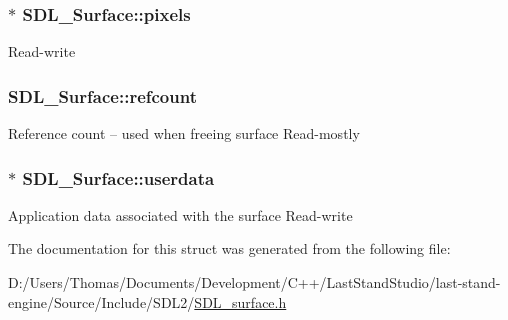 \subsubsection[{pixels}]{$\ast$ S\+D\+L\+\_\+\+Surface\+::pixels}\label{structSDL__Surface_abd9597e0e084b8ef33fe0397bc26d911}
Read-\/write \hypertarget{structSDL__Surface_a03d10628a359c0674f5ceffd574f1641}{}
\subsubsection[{refcount}]{ S\+D\+L\+\_\+\+Surface\+::refcount}\label{structSDL__Surface_a03d10628a359c0674f5ceffd574f1641}
Reference count -- used when freeing surface Read-\/mostly \hypertarget{structSDL__Surface_ae66d973dcb9b57cb34815892e1ee1f31}{}
\subsubsection[{userdata}]{$\ast$ S\+D\+L\+\_\+\+Surface\+::userdata}\label{structSDL__Surface_ae66d973dcb9b57cb34815892e1ee1f31}
Application data associated with the surface Read-\/write 

The documentation for this struct was generated from the following file\+:\begin{DoxyCompactItemize}
\item 
D\+:/\+Users/\+Thomas/\+Documents/\+Development/\+C++/\+Last\+Stand\+Studio/last-\/stand-\/engine/\+Source/\+Include/\+S\+D\+L2/\hyperlink{SDL__surface_8h}{S\+D\+L\+\_\+surface.\+h}\end{DoxyCompactItemize}
